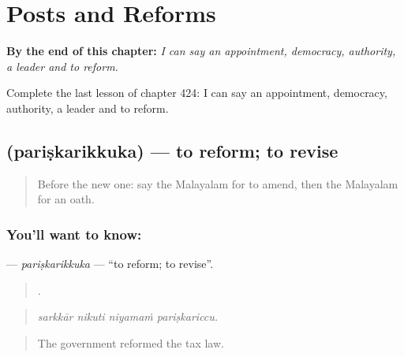 
\chapter{Posts and Reforms}
\label{ch:ml-posts-and-reforms}

\begin{chapteropening}
\textbf{By the end of this chapter:} \emph{I can say an appointment, democracy, authority, a leader and to reform.}

Complete the last lesson of chapter 424: I can say an appointment, democracy, authority, a leader and to reform.
\end{chapteropening}

\section[\texorpdfstring{\ml{പരിഷ്കരിക്കുക} (pariṣkarikkuka)}{പരിഷ്കരിക്കുക (pariṣkarikkuka)}]{ (pariṣkarikkuka) — to reform; to revise}

\label{lesson:ML-C424-pariskarikkuka}



\begin{quote}
Before the new one: say the Malayalam for to amend, then the Malayalam for an oath.
\end{quote}

\subsection*{You'll want to know: }
\textbf{} — \emph{pariṣkarikkuka} — \textquotedblleft{}to reform; to revise\textquotedblright{}.

\begin{quote}
   .
\end{quote}

\begin{quote}
\emph{sarkkār nikuti niyamaṁ pariṣkariccu.}
\end{quote}

\begin{quote}
The government reformed the tax law.
\end{quote}


